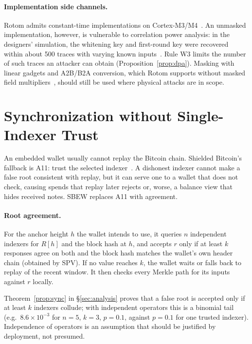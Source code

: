 \documentclass[11pt]{article}
\theoremstyle{remark}
\newcommand{\SB}{Shielded Bitcoin}
\newcommand{\sysname}{\textsf{SBEW}}
\begin{document}
\paragraph{Implementation side channels.} Rotom admits constant-time implementations on Cortex-M3/M4~\cite[§5.4.1]{rotom26}. An unmasked implementation, however, is vulnerable to correlation power analysis: in the designers' simulation, the whitening key and first-round key were recovered within about 500 traces with varying known inputs~\cite[§5.4.2]{rotom26}. Rule W3 limits the number of such traces an attacker can obtain (Proposition~\ref{prop:dpa}). Masking with linear gadgets and A2B/B2A conversion, which Rotom supports without masked field multipliers~\cite[§5.4.2]{rotom26}, should still be used where physical attacks are in scope.

\section{Synchronization without Single-Indexer Trust}
\label{sec:sync}

An embedded wallet usually cannot replay the Bitcoin chain. \SB{}'s fallback is A11: trust the selected indexer~\cite[§17]{sb26}. A dishonest indexer cannot make a false root consistent with replay, but it can serve one to a wallet that does not check, causing spends that replay later rejects or, worse, a balance view that hides received notes. \sysname{} replaces A11 with agreement.

\paragraph{Root agreement.} For the anchor height $h$ the wallet intends to use, it queries $n$ independent indexers for $R[h]$ and the block hash at $h$, and accepts $r$ only if at least $k$ responses agree on both and the block hash matches the wallet's own header chain (obtained by SPV). If no value reaches $k$, the wallet waits or falls back to replay of the recent window. It then checks every Merkle path for its inputs against $r$ locally.

Theorem~\ref{prop:sync} in §\ref{sec:analysis} proves that a false root is accepted only if at least $k$ indexers collude; with independent operators this is a binomial tail (e.g.\ $8.6\times10^{-3}$ for $n{=}5$, $k{=}3$, $p{=}0.1$, against $p=0.1$ for one trusted indexer). Independence of operators is an assumption that should be justified by deployment, not presumed.
\end{document}
